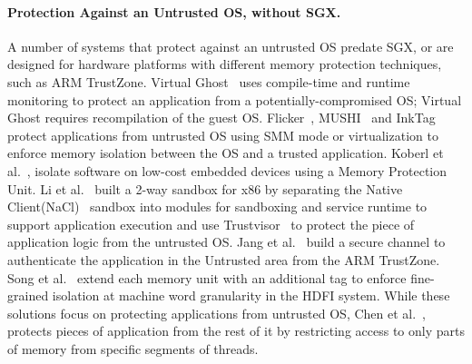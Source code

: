 
\paragraph{Protection Against an Untrusted OS, without SGX.}
A number of systems that protect against an untrusted OS predate SGX, or are designed for hardware platforms with different memory protection techniques, such as ARM TrustZone.
Virtual Ghost~\citep{criswell2014virtual} uses compile-time and runtime monitoring to protect an application
from a potentially-compromised OS; Virtual Ghost requires recompilation of the guest OS.
Flicker~\citep{flicker}, MUSHI~\citep{zhang2012mushi} and InkTag~\citep{inktag} protect applications from untrusted OS using SMM mode or virtualization
to enforce memory isolation between the OS and a trusted application.
Koberl et al.~\citep{koeberl2014trustlite}, isolate software on low-cost embedded devices using a Memory Protection Unit.
Li et al.~\citep{li2014minibox} built a 2-way sandbox for x86 by separating the Native Client(NaCl)~\citep{yee2009native} sandbox into modules for sandboxing and service runtime to support application execution and use Trustvisor~\citep{trustvisor} to protect the piece of application logic from the untrusted OS.
Jang et al.~\citep{jang2015secret} build a secure channel to authenticate the application in the Untrusted area from the ARM TrustZone.
Song et al.~\citep{songhdfi} extend each memory unit with an additional tag
to enforce fine-grained isolation at machine word granularity in the HDFI system.
While these solutions focus on protecting applications from untrusted OS, Chen et  al.~\citep{chenshreds}, protects pieces of application from the rest of it by restricting access to only parts of memory from specific segments of threads.

